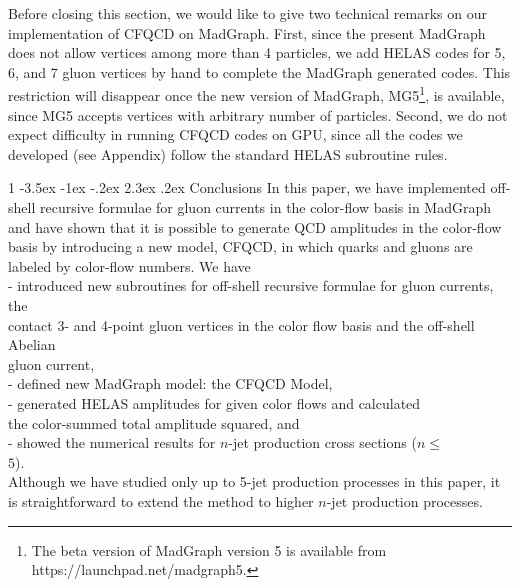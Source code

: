 \documentclass[a4paper,11pt]{article}
\makeatletter
\renewcommand{\section}{%
  \@startsection{section}%
   {1}%
   {\z@}%
   {-3.5ex \@plus -1ex \@minus -.2ex}%
   {2.3ex \@plus.2ex}%
   {\normalfont\large\bfseries}%
}%
\makeatother
\begin{document}
  Before closing this section, we would like to give two
 technical remarks on our implementation of CFQCD on MadGraph.
 First, since the present MadGraph\cite{MG/ME} does not allow vertices
 among more than 4 particles, we add HELAS codes for 5, 6,
 and 7 gluon vertices by hand to complete the MadGraph
 generated codes.
 This restriction will disappear once the new version of
 MadGraph, MG5\footnote{The beta version of MadGraph version 5 is
 available from https://launchpad.net/madgraph5.},
 is available, since MG5 accepts
 vertices with arbitrary number of particles.
 Second, we do not expect difficulty in running CFQCD codes
 on GPU, since all the codes we developed (see Appendix)
 follow the standard HELAS subroutine rules.

\section{Conclusions}
 In this paper, we have implemented off-shell recursive
 formulae for gluon currents in the color-flow basis in MadGraph and have
 shown that it is possible to generate QCD amplitudes
 in the color-flow basis by introducing a new model,
 CFQCD, in which quarks and gluons are labeled by
 color-flow numbers.
 We have\\

 \noindent
 - introduced new subroutines for off-shell recursive
 formulae for gluon currents, the\\
 \hspace{0.4em} contact 3- and 4-point gluon vertices
 in the color flow basis and the off-shell Abelian\\
 \hspace{0.4em}gluon current,\\
 - defined new MadGraph model: the CFQCD Model,\\
 - generated HELAS amplitudes for given color flows
 and calculated\\
 \hspace{0.6em} the color-summed total amplitude squared,
 and \\
 - showed the numerical results for $n$-jet production
 cross sections ($n\leq$\\ \hspace{0.6em}$5$).\\

 Although we have studied only up to 5-jet production processes in this paper, it is straightforward to extend
 the method to higher $n$-jet production processes.
\end{document}
